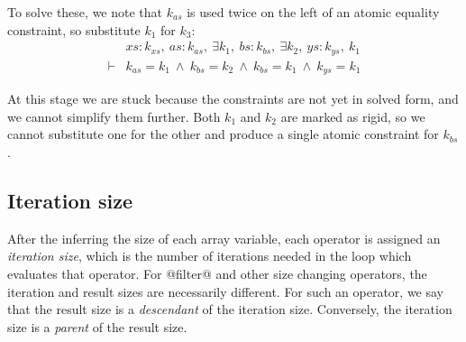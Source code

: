 To solve these, we note that $k_{as}$ is used twice on the left of an atomic equality constraint, so substitute $k_1$ for $k_3$:
$$
\begin{array}{ll}
       & xs : k_{xs},~ as : k_{as},~ \exists k_1,~ bs : k_{bs},~ \exists k_2,~ ys : k_{ys},~ k_1
\\
\vdash &          k_{as}   = k_1
        ~\wedge~  k_{bs}   = k_2
        ~\wedge~  k_{bs}   = k_1
        ~\wedge~  k_{ys}   = k_1
\end{array}
$$

At this stage we are stuck because the constraints are not yet in solved form, and we cannot simplify them further. Both $k_1$ and $k_2$ are marked as rigid, so we cannot substitute one for the other and produce a single atomic constraint for $k_{bs}$.


% 

% 


\subsection{Iteration size}
After the inferring the size of each array variable, each operator is assigned an \emph{iteration size}, which is the number of iterations needed in the loop which evaluates that operator. For @filter@ and other size changing operators, the iteration and result sizes are necessarily different. For such an operator, we say that the result size is a \emph{descendant} of the iteration size. Conversely, the iteration size is a \emph{parent} of the result size. 

